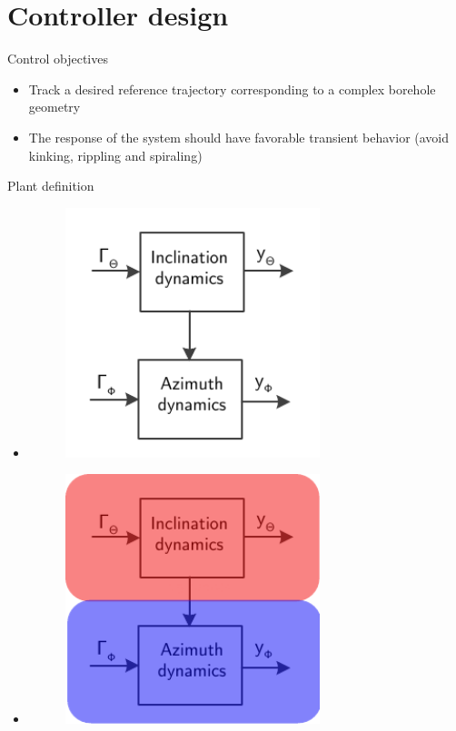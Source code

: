 \documentclass{beamer}
\begin{document}
\section{Controller design}

\begin{frame}{Control objectives}
	\begin{itemize}\setlength\itemsep{1.5em}
		\item Track a desired reference trajectory corresponding to a complex borehole geometry
		\item The response of the system should have favorable transient behavior (avoid kinking, rippling and spiraling)
	\end{itemize}
\end{frame}



\begin{frame}{Plant definition}\setlength{\leftmargini}{0pt}
\begin{itemize} 
				\item <1|only@1> [] \begin{figure}[ht]\centering
				\includegraphics[width=0.7\textwidth]{images/Plant.pdf}
			\end{figure}
			\item <2|only@2> [] \begin{figure}[ht]\centering
				\includegraphics[width=0.7\textwidth]{images/Plant2.pdf}

\end{figure}
\end{itemize}
\end{frame}
\end{document}
